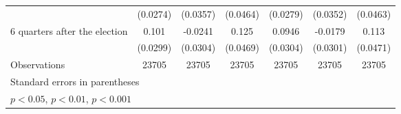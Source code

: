 \begin{table}[!ht]
\begin{tabular}{l*{6}{c}}
                    &    (0.0274)         &    (0.0357)         &    (0.0464)         &    (0.0279)         &    (0.0352)         &    (0.0463)         \\
[1em]
 6 quarters after the election&       0.101\sym{***}&     -0.0241         &       0.125\sym{**} &      0.0946\sym{**} &     -0.0179         &       0.113\sym{*}  \\
                    &    (0.0299)         &    (0.0304)         &    (0.0469)         &    (0.0304)         &    (0.0301)         &    (0.0471)         \\
\hline
Observations        &       23705         &       23705         &       23705         &       23705         &       23705         &       23705         \\
\hline\hline
\multicolumn{7}{l}{\footnotesize Standard errors in parentheses}\\
\multicolumn{7}{l}{\footnotesize \sym{*} \(p<0.05\), \sym{**} \(p<0.01\), \sym{***} \(p<0.001\)}\\
\end{tabular}
\end{table}
